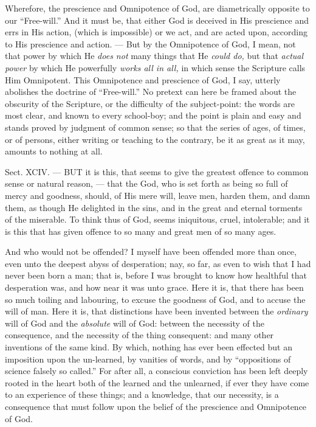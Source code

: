 Wherefore, the prescience and Omnipotence of God, are diametrically opposite to our “Free-will.” And it must be, that either God is deceived in His prescience and errs in His action, (which is impossible) or we act, and are acted upon, according to His prescience and action. — But by the Omnipotence of God, I mean, not that power by which He \emph{does not }many things that He \emph{could do, }but that \emph{actual power }by which He powerfully \emph{works all in all, }in which sense the Scripture calls Him Omnipotent. This Omnipotence and prescience of God, I say, utterly abolishes the doctrine of “Free-will.” No pretext can here be framed about the obscurity of the Scripture, or the difficulty of the subject-point: the words are most clear, and known to every school-boy; and the point is plain and easy and stands proved by judgment of common sense; so that the series of ages, of times, or of persons, either writing or teaching to the contrary, be it as great as it may, amounts to nothing at all.


Sect. XCIV. — BUT it is this, that seems to give the greatest offence to common sense or natural reason, — that the God, who is set forth as being so full of mercy and goodness, should, of His mere will, leave men, harden them, and damn them, as though He delighted in the sins, and in the great and eternal torments of the miserable. To think thus of God, seems iniquitous, cruel, intolerable; and it is this that has given offence to so many and great men of so many ages.

And who would not be offended? I myself have been offended more than once, even unto the deepest abyss of desperation; nay, so far, as even to wish that I had never been born a man; that is, before I was brought to know how healthful that desperation was, and how near it was unto grace. Here it is, that there has been so much toiling and labouring, to excuse the goodness of God, and to accuse the will of man. Here it is, that distinctions have been invented between the \emph{ordinary }will of God and the \emph{absolute }will of God: between the necessity of the consequence, and the necessity of the thing consequent: and many other inventions of the same kind. By which, nothing has ever been effected but an imposition upon the un-learned, by vanities of words, and by “oppositions of science falsely so called.” For after all, a conscious conviction has been left deeply rooted in the heart both of the learned and the unlearned, if ever they have come to an experience of these things; and a knowledge, that our necessity, is a consequence that must follow upon the belief of the prescience and Omnipotence of God.

